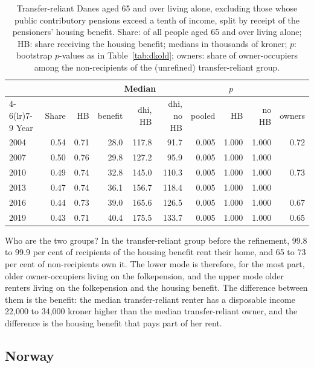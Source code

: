 \begin{table}[t]
\centering\small
\caption{Transfer-reliant Danes aged 65 and over living alone, excluding those whose public contributory pensions exceed a tenth of income, split by receipt of the pensioners' housing benefit. Share: of all people aged 65 and over living alone; HB: share receiving the housing benefit; medians in thousands of kroner; $p$: bootstrap $p$-values as in Table~\ref{tab:dkold}; owners: share of owner-occupiers among the non-recipients of the (unrefined) transfer-reliant group.}\label{tab:hb}
\begin{tabular}{lrrrrrrrrr}
\toprule
 & & & \multicolumn{3}{c}{Median} & \multicolumn{3}{c}{$p$} & \\
\cmidrule(lr){4-6}\cmidrule(lr){7-9}
Year & Share & HB & benefit & dhi, HB & dhi, no HB & pooled & HB & no HB & owners\\
\midrule
2004 & 0.54 & 0.71 & 28.0 & 117.8 & 91.7 & 0.005 & 1.000 & 1.000 & 0.72\\
2007 & 0.50 & 0.76 & 29.8 & 127.2 & 95.9 & 0.005 & 1.000 & 1.000 & \\
2010 & 0.49 & 0.74 & 32.8 & 145.0 & 110.3 & 0.005 & 1.000 & 1.000 & 0.73\\
2013 & 0.47 & 0.74 & 36.1 & 156.7 & 118.4 & 0.005 & 1.000 & 1.000 & \\
2016 & 0.44 & 0.73 & 39.0 & 165.6 & 126.5 & 0.005 & 1.000 & 1.000 & 0.67\\
2019 & 0.43 & 0.71 & 40.4 & 175.5 & 133.7 & 0.005 & 1.000 & 1.000 & 0.65\\
\bottomrule
\end{tabular}
\end{table}

Who are the two groups? In the transfer-reliant group before the refinement, 99.8 to 99.9 per cent of recipients of the housing benefit rent their home, and 65 to 73 per cent of non-recipients own it. The lower mode is therefore, for the most part, older owner-occupiers living on the folkepension, and the upper mode older renters living on the folkepension and the housing benefit. The difference between them is the benefit: the median transfer-reliant renter has a disposable income 22{,}000 to 34{,}000 kroner higher than the median transfer-reliant owner, and the difference is the housing benefit that pays part of her rent.



\subsection{Norway}


